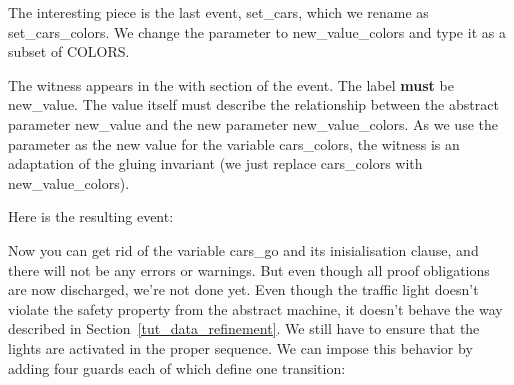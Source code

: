 The interesting piece is the last event, \textsf{set\_cars}, which we rename as \textsf{set\_cars\_colors}.  We change the parameter to \textsf{new\_value\_colors} and type it as a subset of \textsf{COLORS}.

The witness appears in the \textsf{with} section of the event.  The label \textbf{must} be \textsf{new\_value}.  The value itself must describe the relationship between the abstract parameter \textsf{new\_value} and the new parameter \textsf{new\_value\_colors}.  As we use the parameter as the new value for the variable \textsf{cars\_colors}, the witness is an adaptation of the gluing invariant (we just replace \textsf{cars\_colors} with \textsf{new\_value\_colors}).


Here is the resulting event:


Now you can get rid of the variable \textsf{cars\_go} and its inisialisation clause, and there will not be any errors or warnings. But even though all proof obligations are now discharged, we're not done yet. Even though the traffic light doesn't violate the safety property from the abstract machine, it doesn't behave the way described in Section~\ref{tut_data_refinement}.  We still have to ensure that the lights are activated in the proper sequence.  We can impose this behavior by adding four guards each of which define one transition:

